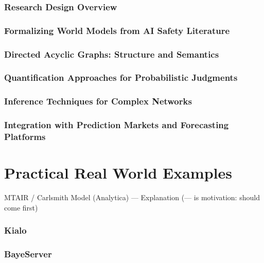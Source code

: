 \documentclass[
  letterpaper,
]{book}
\begin{document}
\subsubsection{Research Design Overview}\label{research-design-overview}

\subsubsection{Formalizing World Models from AI Safety
Literature}\label{formalizing-world-models-from-ai-safety-literature}

\subsubsection{Directed Acyclic Graphs: Structure and
Semantics}\label{directed-acyclic-graphs-structure-and-semantics}

\subsubsection{Quantification Approaches for Probabilistic
Judgments}\label{quantification-approaches-for-probabilistic-judgments}

\subsubsection{Inference Techniques for Complex
Networks}\label{inference-techniques-for-complex-networks}

\subsubsection{Integration with Prediction Markets and Forecasting
Platforms}\label{integration-with-prediction-markets-and-forecasting-platforms}

\section{Practical Real World
Examples}\label{practical-real-world-examples}

MTAIR / Carlsmith Model (Analytica) --- Explanation (--- is motivation:
should come first)

\subsubsection{Kialo}\label{kialo}

\subsubsection{BayeServer}\label{bayeserver}
\end{document}
